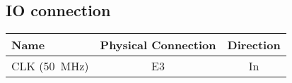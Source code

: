 \subsection{IO connection}
\begin{table}[h]
\centering
\begin{tabular}{|l|c|c|}
	\hline
	{\bf Name} & {\bf Physical Connection} & {\bf Direction}\\ \hline
	CLK (50~MHz) & E3 & In \\ \hline
\end{tabular}
\end{table}

